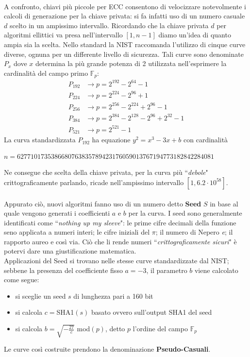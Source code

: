 \documentclass[a4paper,12pt]{tesiinfo}
\newcommand\ddfrac[2]{\frac{\displaystyle #1}{\displaystyle #2}}
\begin{document}
\\
A confronto, chiavi pi\`u piccole per ECC consentono di velocizzare notevolmente i calcoli di generazione per la chiave privata: si fa infatti uso di un numero casuale $d$ scelto in un ampissimo intervallo. Ricordando che la chiave privata $d$ per algoritmi ellittici va presa nell'intervallo $[1, n-1]$ diamo un'idea di quanto ampia sia la scelta. Nello standard \cite{dss} la NIST raccomanda l'utilizzo di cinque curve diverse, ognuna per un differente livello di sicurezza. Tali curve sono denominate $P_{x}$ dove $x$ determina la pi\`u grande potenza di 2 utilizzata nell'esprimere la cardinalit\`a del campo primo $\mathbb{F}_p$:
\begin{align*}
 P_{192} &\to p=2^{192} - 2^{64}-1\\
 P_{224} &\to p=2^{224} - 2^{96}+1\\
 P_{256} &\to p=2^{256} - 2^{224}+ 2^{96}-1\\
 P_{384} &\to p=2^{384} - 2^{128}-2^{96}+2^{32}-1\\
 P_{521} &\to p=2^{521} -1
\end{align*}
La curva standardizzata $P_{192}$ ha equazione $y^2=x^3 -3x+b$ \cite{ec standard} con cardinalit\`a 
\begin{center}
$n=6277101735386680763835789423176059013767194773182842284081$
\end{center}
Ne consegue che scelta della chiave privata, per la curva pi\`u ``\textit{debole}" crittograficamente parlando, ricade nell'ampissimo intervallo $[1, 6.2\cdot 10^{58}]$.
\\
\\
Appurato ci\`o, nuovi algoritmi fanno uso di un numero detto \textbf{Seed} $S$ in base al quale vengono generati i coefficienti $a$ e $b$ per la curva. I seed sono generalmente identificati come ``\textit{nothing up my sleeve}": le prime cifre decimali della funzione seno applicata a numeri interi; le cifre iniziali del $\pi$; il numero di Nepero \textit{e}; il rapporto aureo e cos\`i via. Ci\`o che li rende numeri ``\textit{crittograficamente sicuri}" \`e potervi dare una giustificazione matematica. 
\\
Applicazioni del Seed si trovano nelle stesse curve standardizzate dal NIST; sebbene la presenza del coefficiente fisso $a=-3$, il parametro $b$ viene calcolato come segue: 
\begin{itemize}
    \item si sceglie un seed $s$ di lunghezza pari a 160 bit
    \item si calcola $c = $SHA1$(s)$ basato ovvero sull'output SHA1 del seed
    \item si calcola $b = \sqrt{-\ddfrac{27}{c}}$ mod$(p)$, detto $p$ l'ordine del campo $\mathbb{F}_p$
\end{itemize}
Le curve cos\`i costruite prendono la denominazione \textbf{Pseudo-Casuali}.
%
%
%
%
%
%
%
%
%
%
%
%
%
%
%
%
%
%
\end{document}
